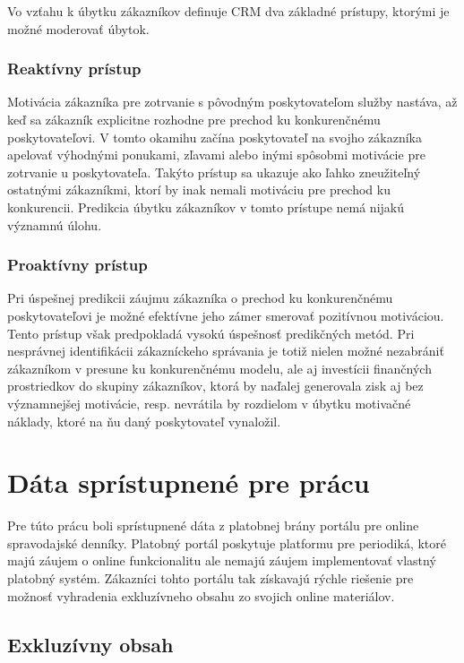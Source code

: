 Vo vzťahu k úbytku zákazníkov definuje CRM dva základné prístupy, ktorými je možné moderovať úbytok. 

\subsubsection{Reaktívny prístup}
\label{analyza_reaktivny_pristup}

Motivácia zákazníka pre zotrvanie s pôvodným poskytovateľom služby nastáva, až keď sa zákazník explicitne rozhodne pre prechod ku konkurenčnému poskytovateľovi. V tomto okamihu začína poskytovateľ na svojho zákazníka apelovať výhodnými ponukami, zľavami alebo inými spôsobmi motivácie pre zotrvanie u poskytovateľa. Takýto prístup sa ukazuje ako ľahko zneužiteľný ostatnými zákazníkmi, ktorí by inak nemali motiváciu pre prechod ku konkurencii. Predikcia úbytku zákazníkov v tomto prístupe nemá nijakú významnú úlohu.

\subsubsection{Proaktívny prístup}
\label{analyza_proaktivny_pristup}

Pri úspešnej predikcii záujmu zákazníka o prechod ku konkurenčnému poskytovateľovi je možné efektívne jeho zámer smerovať pozitívnou motiváciou. Tento prístup však predpokladá vysokú úspešnosť predikčných metód. Pri nesprávnej identifikácii zákazníckeho správania je totiž nielen možné nezabrániť zákazníkom v presune ku konkurenčnému modelu, ale aj investícii finančných prostriedkov do skupiny zákazníkov, ktorá by naďalej generovala zisk aj bez významnejšej motivácie, resp. nevrátila by rozdielom v úbytku motivačné náklady, ktoré na ňu daný poskytovateľ vynaložil.

\section{Dáta sprístupnené pre prácu}
\label{analyza_data}

Pre túto prácu boli sprístupnené dáta z platobnej brány portálu pre online spravodajské denníky. Platobný portál poskytuje platformu pre periodiká, ktoré majú záujem o online funkcionalitu ale nemajú záujem implementovať vlastný platobný systém. Zákazníci tohto portálu tak získavajú rýchle riešenie pre možnosť vyhradenia exkluzívneho obsahu zo svojich online materiálov.

\subsection{Exkluzívny obsah}
\label{analyza_exkluzivny_obsah}

